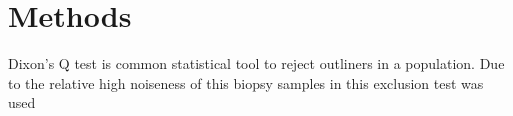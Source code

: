 \chapter{Methods}

Dixon's Q test is common statistical tool to reject outliners in a population. Due to the relative high noiseness of this biopsy samples in this   exclusion test was used 